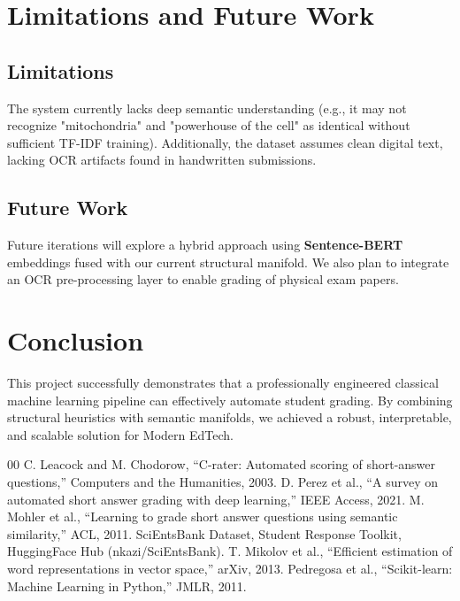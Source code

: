 \documentclass[conference]{IEEEtran}
\begin{document}
\section{Limitations and Future Work}
\subsection{Limitations}
The system currently lacks deep semantic understanding (e.g., it may not recognize "mitochondria" and "powerhouse of the cell" as identical without sufficient TF-IDF training). Additionally, the dataset assumes clean digital text, lacking OCR artifacts found in handwritten submissions.

\subsection{Future Work}
Future iterations will explore a hybrid approach using \textbf{Sentence-BERT} embeddings fused with our current structural manifold. We also plan to integrate an OCR pre-processing layer to enable grading of physical exam papers.

\section{Conclusion}
This project successfully demonstrates that a professionally engineered classical machine learning pipeline can effectively automate student grading. By combining structural heuristics with semantic manifolds, we achieved a robust, interpretable, and scalable solution for Modern EdTech.

\begin{thebibliography}{00}
 C. Leacock and M. Chodorow, ``C-rater: Automated scoring of short-answer questions,'' Computers and the Humanities, 2003.
 D. Perez et al., ``A survey on automated short answer grading with deep learning,'' IEEE Access, 2021.
 M. Mohler et al., ``Learning to grade short answer questions using semantic similarity,'' ACL, 2011.
 SciEntsBank Dataset, Student Response Toolkit, HuggingFace Hub (nkazi/SciEntsBank).
 T. Mikolov et al., ``Efficient estimation of word representations in vector space,'' arXiv, 2013.
 Pedregosa et al., ``Scikit-learn: Machine Learning in Python,'' JMLR, 2011.
\end{thebibliography}
\end{document}
